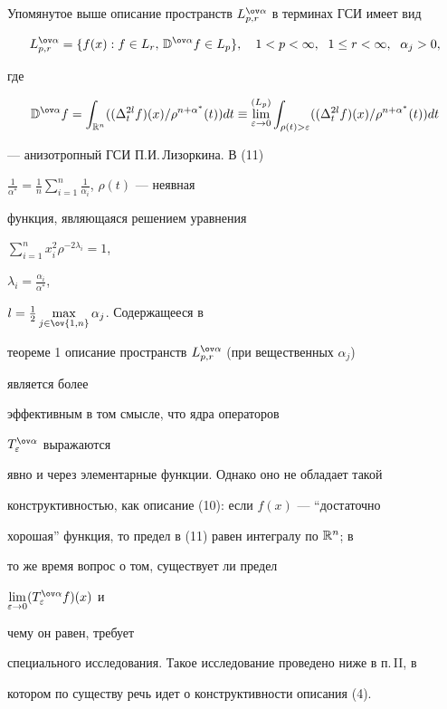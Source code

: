\begin{note}


Упомянутое выше описание пространств $\spaceL$ в терминах ГСИ имеет вид


\begin{equation}


\spaceL=\{f(x):f\in L_r,\,\Bbb D^{\ov\alpha}f\in L_p\},\quad


1<p<\infty,\ \; 1\le r<\infty,\ \;\alpha_j>0,


\end{equation}


где


\begin{equation}


\Bbb D^{\ov\alpha}f=\int_{\Bbb R^n}((\Delta^{2l}_t f)(x)/


\rho^{n+\alpha^*}(t))dt \equiv


\overset{(L_p)}{\lim_{\varepsilon\to 0}}{}


\int_{\rho(t)>\varepsilon}((\Delta^{2l}_t f)(x)/


\rho^{n+\alpha^*}(t))dt


\end{equation}


--- анизотропный ГСИ П.И.\,Лизоркина. В (11)\;


$\frac{1}{\alpha^*}=\frac{1}{n}\sum\limits^n_{i=1}


\frac{1}{\alpha_i}$, $\rho(t)$ --- неявная


функция, являющаяся решением уравнения


$\sum\limits^n_{i=1}x^2_i\rho^{-2\lambda_i}=1$,


$\lambda_i=\frac{\alpha_i}{\alpha^*}$,


$l=\frac{1}{2}\max\limits_{j\in\ov{1,n}}\alpha_j$. Содержащееся в


теореме 1 описание пространств $\spaceL$ (при вещественных $\alpha_j$)


является более


эффективным в том смысле, что ядра операторов


$T^{\ov\alpha}_\varepsilon$ выражаются


явно и через элементарные функции. Однако оно не обладает такой


конструктивностью, как описание (10): если $f(x)$ --- ``достаточно


хорошая'' функция, то предел в (11) равен интегралу по $\Bbb R^n$; в


то же время вопрос о том, существует ли предел


$\lim\limits_{\varepsilon\to 0}(T^{\ov\alpha}_\varepsilon f)(x)$ и


чему он равен, требует


специального исследования. Такое исследование проведено ниже в п.\,II, в


котором по существу речь идет о конструктивности описания (4).


\end{note}





